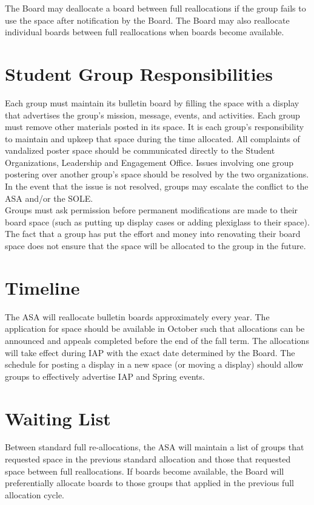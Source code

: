 \documentclass[12pt]{article}
\begin{document}
The Board may deallocate a board between full reallocations if the group fails to use the space after
    notification by the Board.
The Board may also reallocate individual boards between full reallocations when boards become available.

\section{Student Group Responsibilities}
Each group must maintain its bulletin board by filling the space with a display that advertises the group's
    mission, message, events, and activities.
Each group must remove other materials posted in its space.
It is each group's responsibility to maintain and upkeep that space during the time allocated.
All complaints of vandalized poster space should be communicated directly to the Student Organizations,
    Leadership and Engagement Office.
Issues involving one group postering over another group's space should be resolved by the two organizations.
In the event that the issue is not resolved, groups may escalate the conflict to the ASA and/or the SOLE.
\\

Groups must ask permission before permanent modifications are made to their board space (such as
    putting up display cases or adding plexiglass to their space).
The fact that a group has put the effort and money into renovating their board space does not ensure
    that the space will be allocated to the group in the future.

\section{Timeline}
The ASA will reallocate bulletin boards approximately every year.
The application for space should be available in October such that allocations can be announced and
    appeals completed before the end of the fall term.
The allocations will take effect during IAP with the exact date determined by the Board.
The schedule for posting a display in a new space (or moving a display) should allow groups to
    effectively advertise IAP and Spring events.

\section{Waiting List}
Between standard full re-allocations, the ASA will maintain a list of groups that requested space in the
    previous standard allocation and those that requested space between full reallocations.
If boards become available, the Board will preferentially allocate boards to those groups that applied in the
    previous full allocation cycle.
\end{document}
